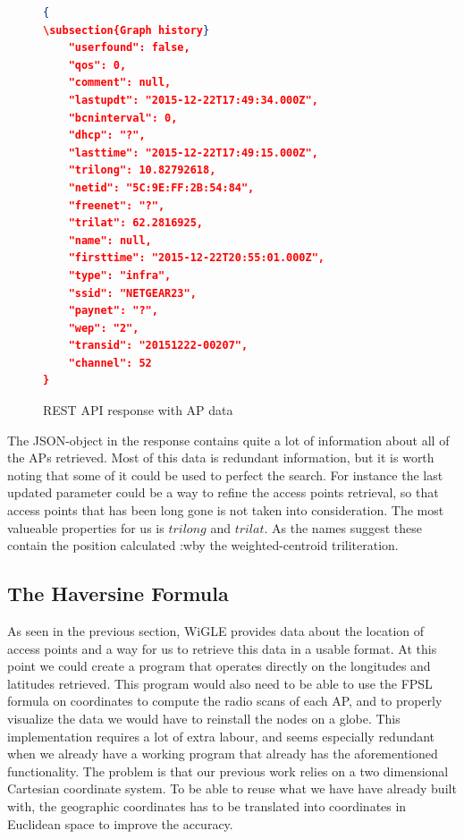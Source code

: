 	\begin{figure}[h]

	\begin{lstlisting}[language=json]
{
\subsection{Graph history}
	"userfound": false,
	"qos": 0,
	"comment": null,
	"lastupdt": "2015-12-22T17:49:34.000Z",
	"bcninterval": 0,
	"dhcp": "?",
	"lasttime": "2015-12-22T17:49:15.000Z",
	"trilong": 10.82792618,
	"netid": "5C:9E:FF:2B:54:84",
	"freenet": "?",
	"trilat": 62.2816925,
	"name": null,
	"firsttime": "2015-12-22T20:55:01.000Z",
	"type": "infra",
	"ssid": "NETGEAR23",
	"paynet": "?",
	"wep": "2",
	"transid": "20151222-00207",
	"channel": 52
}

\end{lstlisting}
\caption{REST API response with AP data}
\label{fig:wigle}
\end{figure}

The JSON-object in the response contains quite a lot of information about all of the APs retrieved. Most of this data is redundant information, but it is worth noting that some of it could be used to perfect the search. For instance the last updated parameter could
be a way to refine the access points retrieval, so that access points that has been long gone is not taken into consideration. The most valueable properties for us is $trilong$ and $trilat$. As the names suggest these contain the position calculated :wby the weighted-centroid triliteration. 

\subsection{The Haversine Formula}
As seen in the previous section, WiGLE provides data about the location of access points and a way for us to retrieve this data in a usable format. 
At this point we could create a program that operates directly on the longitudes and latitudes retrieved.
This program would also need to be able to use the FPSL formula on coordinates to compute the radio scans of each AP,
and to properly visualize the data we would have to reinstall the nodes on a globe. This implementation requires a lot of extra labour, and seems especially
redundant when we already have a working program that already has the aforementioned functionality.
The problem is that our previous work relies on a two dimensional Cartesian coordinate system.
To be able to reuse what we have have already built with, the geographic coordinates has to be translated into coordinates in Euclidean space to improve the accuracy.

